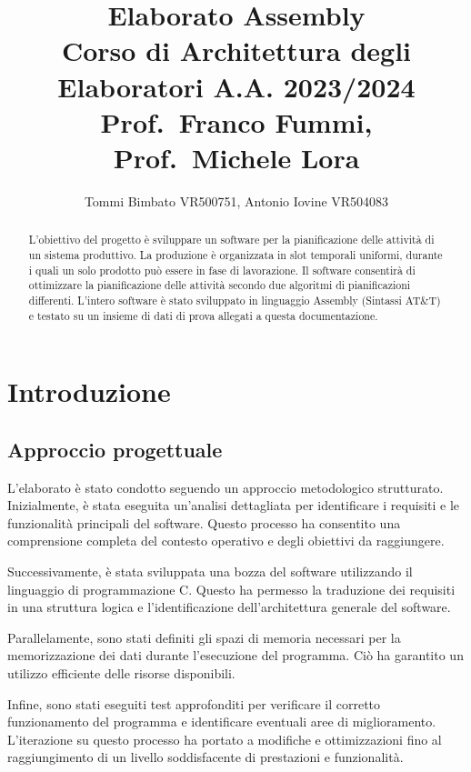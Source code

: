 \documentclass[a4paper]{report}
\author{Tommi Bimbato VR500751, Antonio Iovine VR504083}
\title{Elaborato Assembly \\ \normalsize Corso di Architettura degli Elaboratori A.A. 2023/2024 \\ Prof.\ Franco Fummi, Prof.\ Michele Lora}
\begin{document}
\begin{titlepage}
  \maketitle
\end{titlepage}

\thispagestyle{empty} %

\tableofcontents %

\begin{abstract}
  L'obiettivo del progetto è sviluppare un software per la pianificazione delle attività di un sistema produttivo. La produzione è organizzata in slot temporali uniformi, durante i quali un solo prodotto può essere in fase di lavorazione. Il software consentirà di ottimizzare la pianificazione delle attività secondo due algoritmi di pianificazioni differenti. L'intero software è stato sviluppato in linguaggio Assembly (Sintassi AT\&T) e testato su un insieme di dati di prova allegati a questa documentazione.
\end{abstract}

\chapter{Introduzione}
\section{Approccio progettuale}
L'elaborato è stato condotto seguendo un approccio metodologico strutturato. Inizialmente, è stata eseguita un'analisi dettagliata per identificare i requisiti e le funzionalità principali del software. Questo processo ha consentito una comprensione completa del contesto operativo e degli obiettivi da raggiungere.

Successivamente, è stata sviluppata una bozza del software utilizzando il linguaggio di programmazione C. Questo ha permesso la traduzione dei requisiti in una struttura logica e l'identificazione dell'architettura generale del software.

Parallelamente, sono stati definiti gli spazi di memoria necessari per la memorizzazione dei dati durante l'esecuzione del programma. Ciò ha garantito un utilizzo efficiente delle risorse disponibili.

Infine, sono stati eseguiti test approfonditi per verificare il corretto funzionamento del programma e identificare eventuali aree di miglioramento. L'iterazione su questo processo ha portato a modifiche e ottimizzazioni fino al raggiungimento di un livello soddisfacente di prestazioni e funzionalità.
\end{document}
